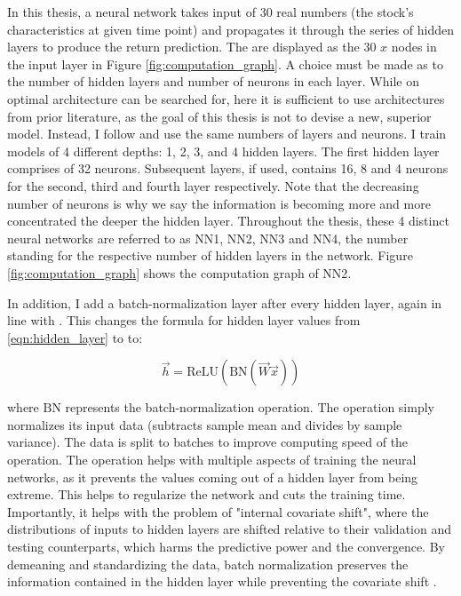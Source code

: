 		In this thesis, a neural network takes input of 30 real numbers (the stock's characteristics at given time point) and propagates it through the series of hidden layers to produce the return prediction. The are displayed as the 30 $x$ nodes in the input layer in Figure \ref{fig:computation_graph}. A choice must be made as to the number of hidden layers and number of neurons in each layer. While on optimal architecture can be searched for, here it is sufficient to use architectures from prior literature, as the goal of this thesis is not to devise a new, superior model. Instead, I follow \cite{gu2020empirical} and use the same numbers of layers and neurons. I train models of 4 different depths: 1, 2, 3, and 4 hidden layers. The first hidden layer comprises of 32 neurons. Subsequent layers, if used, contains 16, 8 and 4 neurons for the second, third and fourth layer respectively. Note that the decreasing number of neurons is why we say the information is becoming more and more concentrated the deeper the hidden layer. Throughout the thesis, these 4 distinct neural networks are referred to as NN1, NN2, NN3 and NN4, the number standing for the respective number of hidden layers in the network.  Figure \ref{fig:computation_graph} shows the computation graph of NN2.
		
		In addition, I add a batch-normalization layer \citep{ioffe2015batch} after every hidden layer, again in line with  \cite{gu2020empirical}. This changes the formula for hidden layer values from \ref{eqn:hidden_layer} to to: 
		
		\begin{equation}
			\vec{h} = \text{ReLU}(\text{BN}(\vec{W}\vec{x}))
		\end{equation}
		
		where $\text{BN}$ represents the batch-normalization operation. The operation simply normalizes its input data (subtracts sample mean and divides by sample variance). The data is split to batches to improve computing speed of the operation. The operation helps with multiple aspects of training the neural networks, as it prevents the values coming out of a hidden layer from being extreme. This helps to regularize the network and cuts the training time. Importantly, it helps with the problem of "internal covariate shift", where the distributions of inputs to hidden layers are shifted relative to their validation and testing counterparts, which harms the predictive power and the convergence. By demeaning and standardizing the data, batch normalization preserves the information contained in the hidden layer while preventing the covariate shift \citep{ioffe2015batch}. 
	

